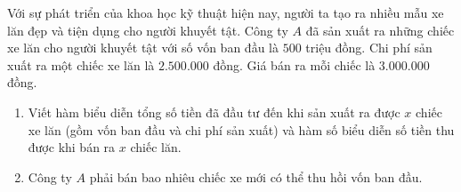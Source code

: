 \begin{bt}%
	Với sự phát triển của khoa học kỹ thuật hiện nay, người ta tạo ra nhiều mẫu xe lăn đẹp và tiện dụng cho người khuyết tật. Công ty $A$ đã sản xuất ra những chiếc xe lăn cho người khuyết tật với số vốn ban đầu là $500$ triệu đồng. Chi phí sản xuất ra một chiếc xe lăn là $2.500.000$ đồng. Giá bán ra mỗi chiếc là $3.000.000$ đồng.
	\begin{enumerate}
		\item Viết hàm biểu diễn tổng số tiền đã đầu tư đến khi sản xuất ra được $x$ chiếc xe lăn (gồm vốn ban đầu và chi phí sản xuất) và hàm số biểu diễn số tiền thu được khi bán ra $x$ chiếc lăn.
		\item Công ty $A$ phải bán bao nhiêu chiếc xe mới có thể thu hồi vốn ban đầu.
	\end{enumerate}
\end{bt}

